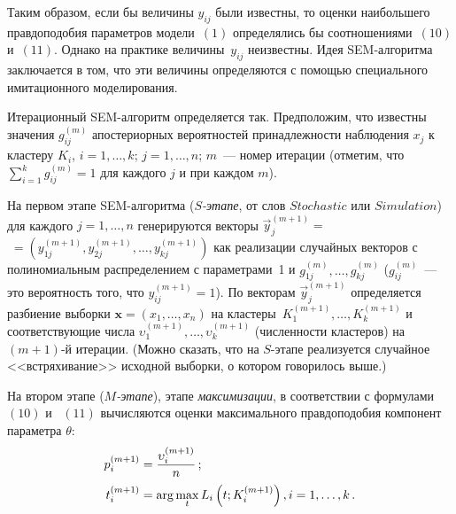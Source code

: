\begin{multicols}{2}
Таким образом, если бы величины $y_{ij}$ были известны, то оценки
наибольшего правдоподобия параметров модели~$(1)$ определялись бы
соотношениями~$(10)$ и~$(11)$. Однако на практике величины~$y_{ij}$
неизвестны. Идея SEM-алгоритма заключается в том, что эти
величины определяются с помощью специального имитационного
моделирования.

Итерационный SEM-алгоритм определяется так. Предположим, что
известны значения $g_{ij}^{(m)}$ апостериорных вероятностей
принадлежности наблюдения $x_{j}$ к кластеру $K_{i}$,
$i=1,\ldots,k$; $j=1,\ldots,n$; $m$~--- номер итерации
(отметим, что
$
\sum\limits_{i=1}^{k}
g_{ij}^{(m)}=1
$
для каждого $j$ и при каждом $m$).

На первом этапе SEM-алгоритма ($S$\textit{-этапе}, от слов
$Stochastic$ или $Simulation$) для каждого $j=1,\ldots,n$
генерируются
векторы $\vec{y}_{j}^{(m+1)}%
=$\linebreak $\;=\left ( y_{1j}^{(m+1)},y_{2j}^{(m+1)},\ldots,y_{kj}^{(m+1)}\right )$ как
реализации\linebreak
 случайных векторов с полиномиальным распределением с
параметрами~1 и $g_{1j}^{(m)},\ldots,g_{kj}^{(m)}$ ($g_{ij}^{(m)}$~---
это вероятность того, что $y_{ij}^{(m+1)}=1$). По векторам $\vec{y}_{j}^{(m+1)}$ определяется разбиение
выборки $\mathbf{x}=(x_{1}%
,\ldots,x_{n})$ на
кластеры\ $K_{1}^{(m+1)},\ldots,K_{k}^{(m+1)}$ и соответствующие числа
$\upsilon_{1}^{(m+1)},\ldots,\upsilon _{k}^{(m+1)}$ (численности
кластеров) на $(m+1)$-й итерации. (Можно сказать, что на $S$-этапе
реализуется случайное <<встряхивание>> исходной выборки, о котором
говорилось выше.)

На втором
этапе ($M$\textit{-этапе}), этапе
\textit{максимизации}, в соответствии с формулами ~$(10)$ и ~$(11)$ вычисляются оценки
максимального правдоподобия компонент
параметра $\theta$:
\begin{align}
p_{i}^{(m+1)}&=\displaystyle\frac{\displaystyle \upsilon_{i}^{(m+1)}\mathstrut}{\displaystyle n\mathstrut}\,;\\
t_{i}^{(m+1)}&=\arg\max\limits_{t}L_{i}\left (t;K_{i}^{(m+1)}\right ),i=1,\ldots
,k\,.
\end{align}



\end{multicols}
